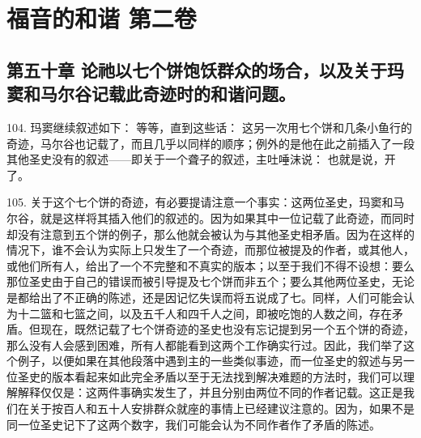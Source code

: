 \section{福音的和谐 第二卷}


\subsection{第五十章 论祂以七个饼饱饫群众的场合，以及关于玛窦和马尔谷记载此奇迹时的和谐问题。}

104. 玛窦继续叙述如下： 等等，直到这些话： 这另一次用七个饼和几条小鱼行的奇迹，马尔谷也记载了，而且几乎以同样的顺序；例外的是他在此之前插入了一段其他圣史没有的叙述——即关于一个聋子的叙述，主吐唾沫说： 也就是说，开了。\par

105. 关于这个七个饼的奇迹，有必要提请注意一个事实：这两位圣史，玛窦和马尔谷，就是这样将其插入他们的叙述的。因为如果其中一位记载了此奇迹，而同时却没有注意到五个饼的例子，那么他就会被认为与其他圣史相矛盾。因为在这样的情况下，谁不会认为实际上只发生了一个奇迹，而那位被提及的作者，或其他人，或他们所有人，给出了一个不完整和不真实的版本；以至于我们不得不设想：要么那位圣史由于自己的错误而被引导提及七个饼而非五个；要么其他两位圣史，无论是都给出了不正确的陈述，还是因记忆失误而将五说成了七。同样，人们可能会认为十二篮和七篮之间，以及五千人和四千人之间，即被吃饱的人数之间，存在矛盾。但现在，既然记载了七个饼奇迹的圣史也没有忘记提到另一个五个饼的奇迹，那么没有人会感到困难，所有人都能看到这两个工作确实行过。因此，我们举了这个例子，以便如果在其他段落中遇到主的一些类似事迹，而一位圣史的叙述与另一位圣史的版本看起来如此完全矛盾以至于无法找到解决难题的方法时，我们可以理解解释仅仅是：这两件事确实发生了，并且分别由两位不同的作者记载。这正是我们在关于按百人和五十人安排群众就座的事情上已经建议注意的。因为，如果不是同一位圣史记下了这两个数字，我们可能会认为不同作者作了矛盾的陈述。\par


